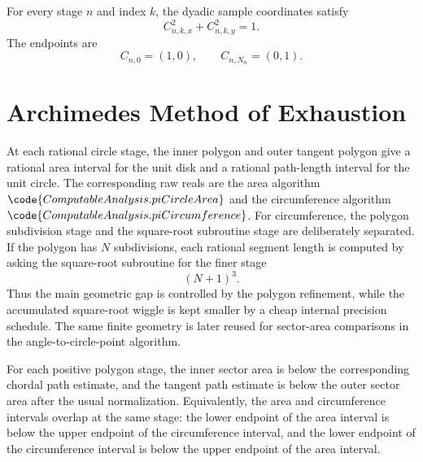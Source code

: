 \begin{theorem}
\label{thm:dyadic-trig-samples}
\leanok
For every stage \(n\) and index \(k\), the dyadic sample coordinates satisfy
\[
  C_{n,k,x}^2+C_{n,k,y}^2=1.
\]
The endpoints are
\[
  C_{n,0}=(1,0),
  \qquad
  C_{n,N_n}=(0,1).
\]
\end{theorem}

\section{Archimedes Method of Exhaustion}

\begin{definition}
\label{def:archimedes-area-circumference-enclosures}
\leanok
At each rational circle stage, the inner polygon and outer tangent polygon
give a rational area interval for the unit disk and a rational path-length
interval for the unit circle.  The corresponding raw reals are the area
algorithm \(\code{ComputableAnalysis.piCircleArea}\) and the circumference
algorithm \(\code{ComputableAnalysis.piCircumference}\).
For circumference, the polygon subdivision stage and the square-root
subroutine stage are deliberately separated.  If the polygon has \(N\)
subdivisions, each rational segment length is computed by asking the
square-root subroutine for the finer stage
\[
  (N+1)^3.
\]
Thus the main geometric gap is controlled by the polygon refinement, while
the accumulated square-root wiggle is kept smaller by a cheap internal
precision schedule.
The same finite geometry is later reused for sector-area comparisons in the
angle-to-circle-point algorithm.
\end{definition}

\begin{theorem}
\label{thm:finite-archimedes-bounds}
\leanok
For each positive polygon stage, the inner sector area is below the
corresponding chordal path estimate, and the tangent path estimate is below
the outer sector area after the usual normalization.  Equivalently, the area
and circumference intervals overlap at the same stage: the lower endpoint of
the area interval is below the upper endpoint of the circumference interval,
and the lower endpoint of the circumference interval is below the upper
endpoint of the area interval.
\end{theorem}

